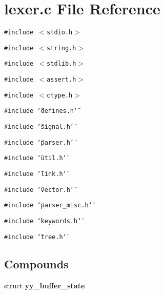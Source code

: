 \section{lexer.c File Reference}
\label{lexer_8c}
{\tt \#include $<$stdio.h$>$}\par
{\tt \#include $<$string.h$>$}\par
{\tt \#include $<$stdlib.h$>$}\par
{\tt \#include $<$assert.h$>$}\par
{\tt \#include $<$ctype.h$>$}\par
{\tt \#include \char`\"{}defines.h\char`\"{}}\par
{\tt \#include \char`\"{}signal.h\char`\"{}}\par
{\tt \#include \char`\"{}parser.h\char`\"{}}\par
{\tt \#include \char`\"{}util.h\char`\"{}}\par
{\tt \#include \char`\"{}link.h\char`\"{}}\par
{\tt \#include \char`\"{}vector.h\char`\"{}}\par
{\tt \#include \char`\"{}parser\_\-misc.h\char`\"{}}\par
{\tt \#include \char`\"{}keywords.h\char`\"{}}\par
{\tt \#include \char`\"{}tree.h\char`\"{}}\par
\subsection*{Compounds}
\begin{CompactItemize}
\item 
struct {\bf yy\_\-buffer\_\-state}
\end{CompactItemize}
